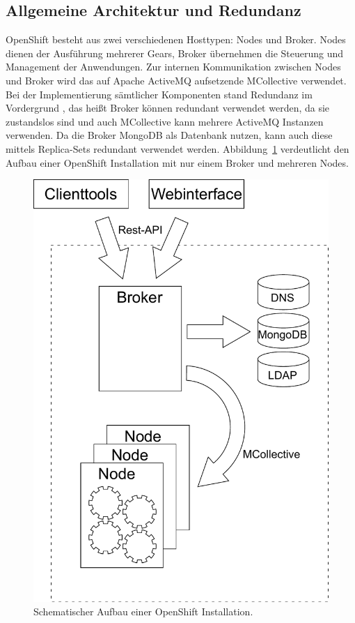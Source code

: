 \documentclass[10pt,a4paper,compsoc]{IEEEtran}
\begin{document}
\subsection{Allgemeine Architektur und Redundanz}
OpenShift besteht aus zwei verschiedenen Hosttypen: Nodes und Broker. Nodes dienen der Ausführung mehrerer Gears, Broker übernehmen die Steuerung und Management der Anwendungen. Zur internen Kommunikation zwischen Nodes und Broker wird das auf Apache ActiveMQ aufsetzende MCollective verwendet.
Bei der Implementierung sämtlicher Komponenten stand Redundanz im Vordergrund \cite[2.1]{os_buildyourown}, das heißt Broker können redundant verwendet werden, da sie zustandslos sind und auch MCollective kann mehrere ActiveMQ Instanzen verwenden. Da die Broker MongoDB als Datenbank nutzen, kann auch diese mittels Replica-Sets redundant verwendet werden. Abbildung~\ref{fig:architecture} verdeutlicht den Aufbau einer OpenShift Installation mit nur einem Broker und mehreren Nodes.

\begin{figure}[htbp]
\centering
\includegraphics[width=0.8\linewidth]{imgs/architecture}
\caption{Schematischer Aufbau einer OpenShift Installation.}
\label{fig:architecture}
\end{figure}
\end{document}
